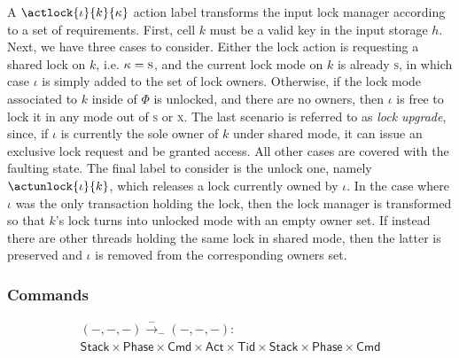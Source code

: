 A $\actlock{\iota}{k}{\kappa}$ action label transforms the input lock manager according to a set of requirements. First, cell $k$ must be a valid key in the input storage $h$. Next, we have three cases to consider. Either the lock action is requesting a shared lock on $k$, i.e. $\kappa = \textsc{s}$, and the current lock mode on $k$ is already \textsc{s}, in which case $\iota$ is simply added to the set of lock owners. Otherwise, if the lock mode associated to $k$ inside of $\Phi$ is unlocked, and there are no owners, then $\iota$ is free to lock it in any mode out of \textsc{s} or \textsc{x}. The last scenario is referred to as \textit{lock upgrade}, since, if $\iota$ is currently the sole owner of $k$ under shared mode, it can issue an exclusive lock request and be granted access. All other cases are covered with the faulting state. The final label to consider is the unlock one, namely $\actunlock{\iota}{k}$, which releases a lock currently owned by $\iota$. In the case where $\iota$ was the only transaction holding the lock, then the lock manager is transformed so that $k$'s lock turns into unlocked mode with an empty owner set. If instead there are other threads holding the same lock in shared mode, then the latter is preserved and $\iota$ is removed from the corresponding owners set.

\subsubsection{Commands}

\begin{gather*}
		(-, -, -) \xrightarrow{-}_- (-, -, -) : \\
		\mathsf{Stack} \times \mathsf{Phase} \times \mathsf{Cmd}
		\times \mathsf{Act} \times \mathsf{Tid} \times
		\mathsf{Stack} \times \mathsf{Phase} \times \mathsf{Cmd}
	\end{gather*}